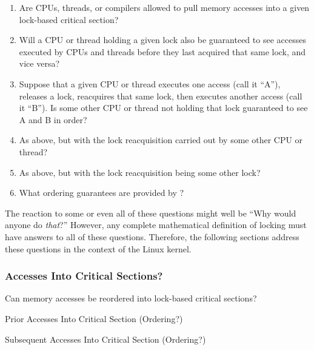 \begin{enumerate}
\item	Are CPUs, threads, or compilers allowed to pull memory accesses
	into a given lock-based critical section?
\item	Will a CPU or thread holding a given lock also be guaranteed
	to see accesses executed by CPUs and threads before they last
	acquired that same lock, and vice versa?
\item	Suppose that a given CPU or thread executes one access
	(call it ``A''), releases a lock, reacquires that same lock,
	then executes another access (call it ``B'')\@.
	Is some other CPU or thread not holding that lock guaranteed to
	see A and B in order?
\item	As above, but with the lock reacquisition carried out by some
	other CPU or thread?
\item	As above, but with the lock reacquisition being some other lock?
\item	What ordering guarantees are provided by ?
\end{enumerate}

The reaction to some or even all of these questions might well be ``Why
would anyone do \emph{that}?''
However, any complete mathematical definition of locking must have
answers to all of these questions.
Therefore, the following sections address these questions in the context
of the Linux kernel.

\subsubsection{Accesses Into Critical Sections?}
\label{sec:memorder:Accesses Into Critical Sections?}

Can memory accesses be reordered into lock-based critical sections?

\begin{listing}

\caption{Prior Accesses Into Critical Section (Ordering?)}
\label{lst:memorder:Prior Accesses Into Critical Section (Ordering?)}
\end{listing}

\begin{listing}

\caption{Subsequent Accesses Into Critical Section (Ordering?)}
\label{lst:memorder:Subsequent Accesses Into Critical Section (Ordering?)}
\end{listing}

